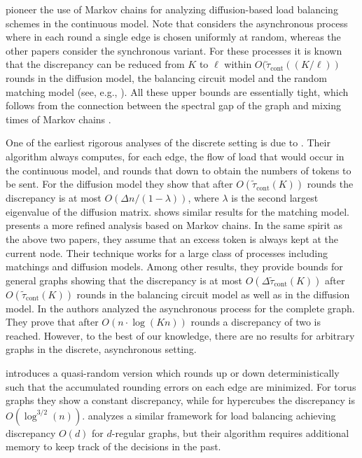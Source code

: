 \documentclass[twoside,leqno]{article}
\DeclareMathOperator{\1}{\mathbf{1}}
\newcommand{\tauspectral}[1]{{\widetilde{\tau}}_{\mathrm{cont}}\left({#1}\right)}
\numberwithin{equation}{section}
\begin{document}
\cite{DBLP:journals/jpdc/Cybenko89,DBLP:journals/concurrency/Boillat90, DBLP:books/daglib/0067089,DBLP:journals/tit/BoydGPS06}
pioneer the use of Markov chains for analyzing diffusion-based load balancing schemes in the continuous model. Note that \cite{DBLP:journals/tit/BoydGPS06} considers the asynchronous process where in each round a single edge is chosen uniformly at random, whereas the other papers consider the synchronous variant.
For these processes it is known that the discrepancy can be reduced from $K$ to $\ell$ within  $O(\tauspectral{(K/\ell)}$ rounds in the diffusion model, the balancing circuit model and the random matching model (see, e.g., \cite{DBLP:conf/focs/RabaniSW98}). 
All these upper bounds are essentially tight, which follows from the connection between the spectral gap of the graph and mixing times of Markov chains \cite{Venkat}.

\medskip

One of the earliest rigorous analyses of the discrete setting is due to \cite{DBLP:journals/mst/MuthukrishnanGS98}.
Their algorithm always computes, for each edge, the flow of load that would occur in the continuous model, and rounds that down to obtain the numbers of tokens to be sent.
For the diffusion model they show that after $O(\tauspectral{K})$ rounds the discrepancy is at most $O(\Delta n/(1-\lambda))$, where $\lambda$ is the second largest eigenvalue of the diffusion matrix.
\cite{DBLP:journals/jcss/GhoshM96} shows similar results for the matching model.
\cite{DBLP:conf/focs/RabaniSW98} presents a more refined analysis based on Markov chains. 
In the same spirit as the above two papers, they assume that an excess token is always kept at the current node. Their technique works for a large class of processes including  matchings and diffusion models.
Among other results, they provide bounds for general graphs showing that the discrepancy is at most $O(\Delta\tauspectral{K})$ after $O(\tauspectral{K})$ rounds in the balancing circuit model as well as in the diffusion model.
In \cite{DBLP:conf/ipps/BerenbrinkFKK19} the authors analyzed the asynchronous process  for the complete graph. They prove that after $O(n \cdot \log (Kn))$ rounds a discrepancy of two is reached. However, to the best of our knowledge, there are no results for arbitrary graphs in the discrete, asynchronous setting.

\cite{DBLP:journals/siamcomp/FriedrichGS12} introduces a quasi-random version which rounds up or down deterministically such that the accumulated rounding errors
on each edge are minimized. For torus graphs they show a constant discrepancy, while for hypercubes the discrepancy is $O(\log^{3/2}(n))$.
\cite{DBLP:journals/dc/AkbariBS16} analyzes a similar framework for load balancing achieving discrepancy $O(d)$ for $d$-regular graphs, but their algorithm requires additional memory to keep track of the decisions in the past.
\end{document}
